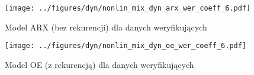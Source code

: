 \documentclass[a4paper,titlepage,11pt,floatssmall]{mwrep}
\begin{document}
\begin{figure}[H]
\centering
\texttt{[image: ../figures/dyn/nonlin\_mix\_dyn\_arx\_wer\_coeff\_6.pdf]}
\caption{Model ARX (bez rekurencji) dla danych weryfikujących}
\end{figure}

\begin{figure}[H]
\centering
\texttt{[image: ../figures/dyn/nonlin\_mix\_dyn\_oe\_wer\_coeff\_6.pdf]}
\caption{Model OE (z rekurencją) dla danych weryfikujących}
\end{figure}
\end{document}
